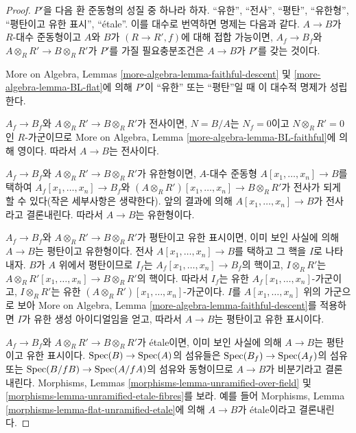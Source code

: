 \begin{proof}
$P'$을 다음 환 준동형의 성질 중 하나라 하자.
``유한'', ``전사'', ``평탄'', ``유한형'',
``평탄이고 유한 표시'', ``\'etale''.
이를 대수로 번역하면 명제는 다음과 같다. $A \to B$가
$R$-대수 준동형이고 $A$와 $B$가 $(R \to R', f)$에 대해 접합
가능이면, $A_f \to B_f$와
$A \otimes_R R' \to B \otimes_R R'$가 $P'$를 가질 필요충분조건은
$A \to B$가 $P'$를 갖는 것이다.

\medskip\noindent
More on Algebra, Lemmas \ref{more-algebra-lemma-faithful-descent} 및
\ref{more-algebra-lemma-BL-flat}에 의해 $P'$이 ``유한'' 또는
``평탄''일 때 이 대수적 명제가 성립한다.

\medskip\noindent
$A_f \to B_f$와 $A \otimes_R R' \to B \otimes_R R'$가 전사이면,
$N = B/A$는 $N_f = 0$이고 $N \otimes_R R' = 0$인 $R$-가군이므로
More on Algebra, Lemma \ref{more-algebra-lemma-BL-faithful}에 의해
영이다. 따라서 $A \to B$는 전사이다.

\medskip\noindent
$A_f \to B_f$와 $A \otimes_R R' \to B \otimes_R R'$가 유한형이면,
$A$-대수 준동형 $A[x_1, \ldots, x_n] \to B$를 택하여
$A_f[x_1, \ldots, x_n] \to B_f$와
$(A \otimes_R R')[x_1, \ldots, x_n] \to B \otimes_R R'$가 전사가
되게 할 수 있다(작은 세부사항은 생략한다). 앞의 결과에 의해
$A[x_1, \ldots, x_n] \to B$가 전사라고 결론내린다. 따라서
$A \to B$는 유한형이다.

\medskip\noindent
$A_f \to B_f$와 $A \otimes_R R' \to B \otimes_R R'$가 평탄이고
유한 표시이면, 이미 보인 사실에 의해 $A \to B$는 평탄이고 유한형이다.
전사 $A[x_1, \ldots, x_n] \to B$를 택하고 그 핵을 $I$로 나타내자.
$B$가 $A$ 위에서 평탄이므로 $I_f$는
$A_f[x_1, \ldots, x_n] \to B_f$의 핵이고, $I \otimes_R R'$는
$A \otimes_R R'[x_1, \ldots, x_n] \to B \otimes_R R'$의 핵이다.
따라서 $I_f$는 유한 $A_f[x_1, \ldots, x_n]$-가군이고,
$I \otimes_R R'$는 유한
$(A \otimes_R R')[x_1, \ldots, x_n]$-가군이다. $I$를
$A[x_1, \ldots, x_n]$ 위의 가군으로 보아 More on Algebra, Lemma
\ref{more-algebra-lemma-faithful-descent}를 적용하면 $I$가 유한 생성
아이디얼임을 얻고, 따라서 $A \to B$는 평탄이고 유한 표시이다.

\medskip\noindent
$A_f \to B_f$와 $A \otimes_R R' \to B \otimes_R R'$가 \'etale이면,
이미 보인 사실에 의해 $A \to B$는 평탄이고 유한 표시이다.
$\mathop{\mathrm{Spec}}(B) \to \mathop{\mathrm{Spec}}(A)$의 섬유들은
$\mathop{\mathrm{Spec}}(B_f) \to \mathop{\mathrm{Spec}}(A_f)$의 섬유 또는
$\mathop{\mathrm{Spec}}(B/fB) \to \mathop{\mathrm{Spec}}(A/fA)$의 섬유와 동형이므로
$A \to B$가 비분기라고 결론내린다. Morphisms, Lemmas
\ref{morphisms-lemma-unramified-over-field} 및
\ref{morphisms-lemma-unramified-etale-fibres}를 보라. 예를 들어
Morphisms, Lemma \ref{morphisms-lemma-flat-unramified-etale}에 의해
$A \to B$가 \'etale이라고 결론내린다.
\end{proof}

